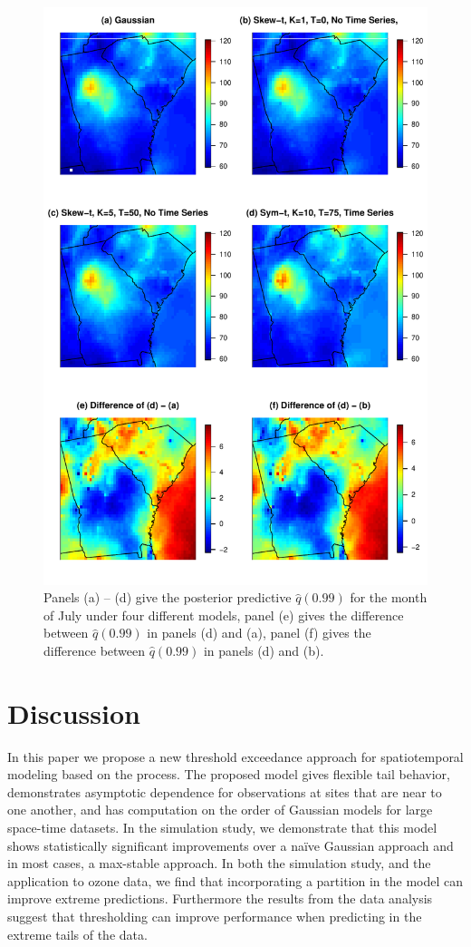 \begin{figure}
  \centering
  \includegraphics[width=0.8\linewidth]{plots/q99-ozone.pdf}
  \caption{Panels (a) -- (d) give the posterior predictive $\widehat{q}(0.99)$ for the month of July under four different models, panel (e) gives the difference between $\widehat{q}(0.99)$ in panels (d) and (a), panel (f) gives the difference between $\widehat{q}(0.99)$ in panels (d) and (b).}
  \label{stfig:ozoneq99}
\end{figure}

\section{Discussion}\label{sts:con}
In this paper we propose a new threshold exceedance approach for spatiotemporal modeling based on the \skewt process.
The proposed model gives flexible tail behavior, demonstrates asymptotic dependence for observations at sites that are near to one another, and has computation on the order of Gaussian models for large space-time datasets.
In the simulation study, we demonstrate that this model shows statistically significant improvements over a na\"{i}ve Gaussian approach and in most cases, a max-stable approach.
In both the simulation study, and the application to ozone data, we find that incorporating a partition in the model can improve extreme predictions.
Furthermore the results from the data analysis suggest that thresholding can improve performance when predicting in the extreme tails of the data.

